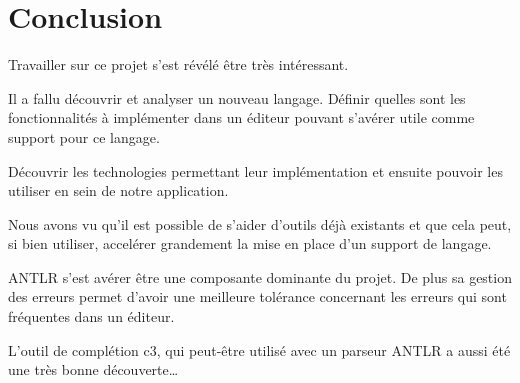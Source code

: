 \documentclass[
    iict, %
    il, %
]{heig-tb}
\begin{document}


\chapter{Conclusion}



Travailler sur ce projet s'est révélé être très intéressant.


Il a fallu découvrir et analyser un nouveau langage.
Définir quelles sont les fonctionnalités à implémenter dans un éditeur pouvant s'avérer utile comme support pour ce langage.

Découvrir les technologies permettant leur implémentation et ensuite pouvoir les utiliser en sein de notre application. %



Nous avons vu qu'il est possible de s'aider d'outils déjà existants et que cela peut, si bien utiliser, accelérer grandement la mise en place d'un support de langage.

ANTLR s'est avérer être une composante dominante du projet. De plus sa gestion des erreurs permet d'avoir une meilleure tolérance concernant les erreurs
qui sont fréquentes dans un éditeur.

L'outil de complétion c3, qui peut-être utilisé avec un parseur ANTLR a aussi été une très bonne découverte\dots

\end{document}
